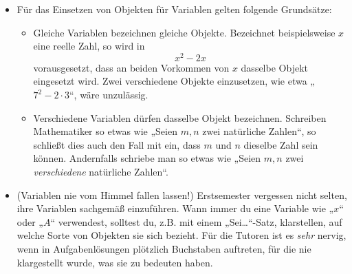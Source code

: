 \begin{bem} \quad
    \begin{itemize}
        \item Für das Einsetzen von Objekten für Variablen gelten folgende Grundsätze:
        \begin{itemize}
            \item Gleiche Variablen bezeichnen gleiche Objekte. Bezeichnet beispielsweise $x$ eine reelle Zahl, so wird in
                \[ x^2-2x \]
            vorausgesetzt, dass an beiden Vorkommen von $x$ dasselbe Objekt eingesetzt wird. Zwei verschiedene Objekte einzusetzen, wie etwa „$7^2-2\cdot 3$“, wäre unzulässig.
            \item Verschiedene Variablen dürfen dasselbe Objekt bezeichnen. Schreiben Mathematiker so etwas wie „Seien $m,n$ zwei natürliche Zahlen“, so schließt dies auch den Fall mit ein, dass $m$ und $n$ dieselbe Zahl sein können. Andernfalls schriebe man so etwas wie „Seien $m,n$ zwei \emph{verschiedene} natürliche Zahlen“.
        \end{itemize}
        \item(Variablen nie vom Himmel fallen lassen!) Erstsemester vergessen nicht selten, ihre Variablen sachgemäß einzuführen. Wann immer du eine Variable wie „$x$“ oder „$A$“ verwendest, solltest du, z.B. mit einem „Sei\dots“-Satz, klarstellen, auf welche Sorte von Objekten sie sich bezieht. Für die Tutoren ist es \emph{sehr} nervig, wenn in Aufgabenlösungen plötzlich Buchstaben auftreten, für die nie klargestellt wurde, was sie zu bedeuten haben.
    \end{itemize}
\end{bem}


